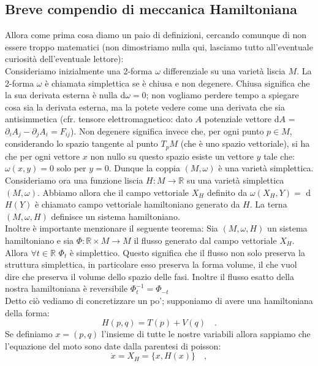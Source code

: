 \documentclass[10pt,a4paper]{article}
\begin{document}
\subsection{Breve compendio di meccanica Hamiltoniana}
Allora come prima cosa diamo un paio di definizioni, cercando comunque di non essere troppo matematici (non dimostriamo nulla qui, lasciamo tutto all'eventuale curiosità dell'eventuale lettore):\\
Consideriamo inizialmente una 2-forma $\omega$ differenziale su una varietà liscia $M$. La 2-forma $\omega$ è chiamata simplettica se è chiusa e non degenere. Chiusa significa che la sua derivata esterna è nulla d$\omega = 0$; non vogliamo perdere tempo a spiegare cosa sia la derivata esterna, ma la potete vedere come una derivata che sia antisimmetica (cfr. tensore elettromagnetico: dato $A$ potenziale vettore d$A$ = $\partial_i A_j - \partial_j A_i = F_{ij}$). Non degenere significa invece che, per ogni punto $p \in M$, considerando lo spazio tangente al punto $T_pM$ (che è uno spazio vettoriale), si ha che per ogni vettore $x$ non nullo su questo spazio esiste un vettore $y$ tale che: $\omega(x, y) = 0$ solo per $y=0$. Dunque la coppia $(M, \omega)$ è una varietà simplettica.\\
Consideriamo ora una funzione liscia $H: M \to \mathbb{R}$ su una varietà simplettica $(M, \omega)$. Abbiamo allora che il campo vettoriale $X_H$ definito da $\omega(X_H, Y) = $ d$H(Y)$ è chiamato campo vettoriale hamiltoniano generato da $H$. La terna $(M, \omega, H)$ definisce un sistema hamiltoniano.\\
Inoltre è importante menzionare il seguente teorema: Sia $(M, \omega, H)$ un sistema hamiltoniano e sia $\Phi: \mathbb{R} \times M \to M$ il flusso generato dal campo vettoriale $X_H$. Allora $\forall t \in \mathbb{R}$  $\Phi_t$ è simplettico. Questo significa che il flusso non solo preserva la struttura simplettica, in particolare esso preserva la forma volume, il che vuol dire che preserva il volume dello spazio delle fasi. Inoltre il flusso esatto della nostra hamiltoniana è reversibile $\Phi_t^{-1} = \Phi_{-t}$ \\
Detto ciò vediamo di concretizzare un po'; supponiamo di avere una hamiltoniana della forma:
\begin{equation}
H(p, q) = T(p) + V(q) \quad.
\end{equation}
Se definiamo $x = (p, q)$ l'insieme di tutte le nostre variabili allora sappiamo che l'equazione del moto sono date dalla parentesi di poisson:
\begin{equation}
\dot{x} = X_H = \{x, H(x) \} \quad,
\end{equation}
\end{document}
